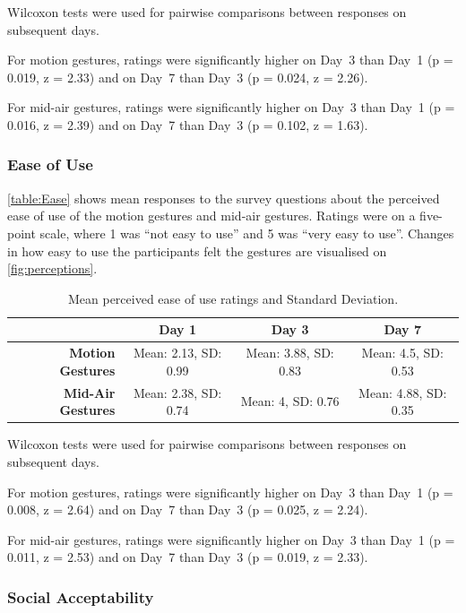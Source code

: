 \documentclass{l4proj}
\begin{document}
Wilcoxon tests were used for pairwise comparisons between responses on subsequent days.

For motion gestures, ratings were significantly higher on Day~3 than Day~1 (p = 0.019, z = 2.33) and on Day~7 than Day~3 (p = 0.024, z = 2.26).

For mid-air gestures, ratings were significantly higher on Day~3 than Day~1 (p = 0.016, z = 2.39) and on Day~7 than Day~3 (p = 0.102, z = 1.63).
\hfill \break






\subsubsection{Ease of Use}

\autoref{table:Ease} shows mean responses to the survey questions about the perceived ease of use of the motion gestures and mid-air gestures. Ratings were on a five-point scale, where 1 was ``not easy to use'' and 5 was ``very easy to use''. Changes in how easy to use the participants felt the gestures are visualised on \autoref{fig:perceptions}. 

\begin{table}[h!]
\centering
\begin{tabular}{r c c c}
                              & \textbf{Day 1} & \textbf{Day 3} & \textbf{Day 7} \\ \toprule
    \textbf{Motion Gestures}  & Mean: 2.13, SD: 0.99    & Mean: 3.88, SD: 0.83    & Mean: 4.5, SD: 0.53\\
    \textbf{Mid-Air Gestures} & Mean: 2.38, SD: 0.74   & Mean: 4, SD: 0.76    & Mean: 4.88, SD: 0.35 \\ \bottomrule
\end{tabular}
\caption{Mean perceived ease of use ratings and Standard Deviation.}
\label{table:Ease}
\end{table}
Wilcoxon tests were used for pairwise comparisons between responses on subsequent days.

For motion gestures, ratings were significantly higher on Day~3 than Day~1 (p = 0.008, z = 2.64) and on Day~7 than Day~3 (p = 0.025, z = 2.24).

For mid-air gestures, ratings were significantly higher on Day~3 than Day~1 (p = 0.011, z = 2.53) and on Day~7 than Day~3 (p = 0.019, z = 2.33).
\hfill \break






\subsubsection{Social Acceptability}
\end{document}
